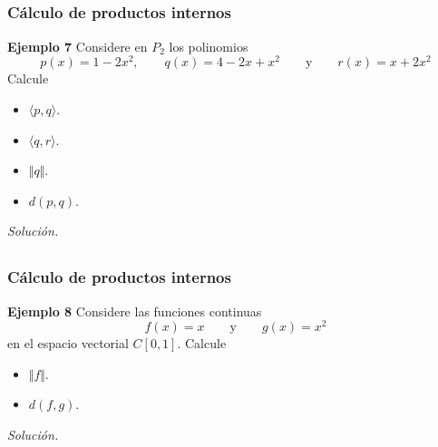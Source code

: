 
\subsection{}

\begin{frame}\frametitle{Cálculo de productos internos}

\begin{ej}{\textbf{Ejemplo 7}}\justifying
	Considere en $P_2$ los polinomios
	\[
		p(x) = 1-2x^2, \qquad q(x) = 4-2x+x^2 \qquad \text{y} \qquad r(x) = x+2x^2
	\]
	Calcule
	
	\vspace{-2mm}
	\begin{multicols}{4}
		\begin{itemize}
			\item[\labelname{$a$}] $\langle p,q \rangle$.
			\item[\labelname{$b$}] $\langle q,r \rangle$.
			\item[\labelname{$c$}] $\Vert q \Vert$.
			\item[\labelname{$d$}] $d(p,q)$.
		\end{itemize}
	\end{multicols}	
	
	\vspace{-2mm}
\end{ej}
\textit{Solución.}

\end{frame}


\subsection{}

\begin{frame}\frametitle{Cálculo de productos internos}
	
	\begin{ej}{\textbf{Ejemplo 8}}\justifying
		Considere las funciones continuas
		\[
			f(x) = x \qquad \text{y} \qquad g(x) = x^2
		\]
		en el espacio vectorial $C[0,1]$. Calcule
		
		\vspace{-2mm}
		\begin{multicols}{2}
			\begin{itemize}
				\item[\labelname{$a$}] $\Vert f \Vert$.
				\item[\labelname{$b$}] $d(f,g)$.
			\end{itemize}
		\end{multicols}	
		
		\vspace{-2mm}
	\end{ej}
	\textit{Solución.}
	
\end{frame}

